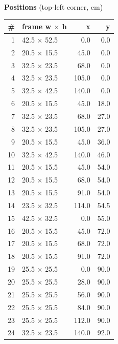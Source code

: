 \documentclass[a4paper,landscape,10pt]{article}
\begin{document}
\begin{minipage}[t]{0.25\textwidth}
\vspace{8pt}
{\bfseries Positions} (top-left corner, cm)\\[2pt]
\tiny
\begin{tabular}{@{}r l r r@{}}
\toprule
\# & frame w $\times$ h & x & y \\
\midrule
1 & 42.5 $\times$ 52.5 & 0.0 & 0.0 \\
2 & 20.5 $\times$ 15.5 & 45.0 & 0.0 \\
3 & 32.5 $\times$ 23.5 & 68.0 & 0.0 \\
4 & 32.5 $\times$ 23.5 & 105.0 & 0.0 \\
5 & 32.5 $\times$ 42.5 & 140.0 & 0.0 \\
6 & 20.5 $\times$ 15.5 & 45.0 & 18.0 \\
7 & 32.5 $\times$ 23.5 & 68.0 & 27.0 \\
8 & 32.5 $\times$ 23.5 & 105.0 & 27.0 \\
9 & 20.5 $\times$ 15.5 & 45.0 & 36.0 \\
10 & 32.5 $\times$ 42.5 & 140.0 & 46.0 \\
11 & 20.5 $\times$ 15.5 & 45.0 & 54.0 \\
12 & 20.5 $\times$ 15.5 & 68.0 & 54.0 \\
13 & 20.5 $\times$ 15.5 & 91.0 & 54.0 \\
14 & 23.5 $\times$ 32.5 & 114.0 & 54.5 \\
15 & 42.5 $\times$ 32.5 & 0.0 & 55.0 \\
16 & 20.5 $\times$ 15.5 & 45.0 & 72.0 \\
17 & 20.5 $\times$ 15.5 & 68.0 & 72.0 \\
18 & 20.5 $\times$ 15.5 & 91.0 & 72.0 \\
19 & 25.5 $\times$ 25.5 & 0.0 & 90.0 \\
20 & 25.5 $\times$ 25.5 & 28.0 & 90.0 \\
21 & 25.5 $\times$ 25.5 & 56.0 & 90.0 \\
22 & 25.5 $\times$ 25.5 & 84.0 & 90.0 \\
23 & 25.5 $\times$ 25.5 & 112.0 & 90.0 \\
24 & 32.5 $\times$ 23.5 & 140.0 & 92.0 \\
\bottomrule
\end{tabular}
\end{minipage}
\clearpage
\end{document}
